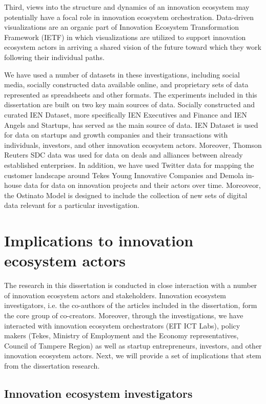 Third, views into the structure and dynamics of an innovation ecosystem may potentially have a focal role in innovation ecosystem orchestration. Data-driven visualizations are an organic part of Innovation Ecosystem Transformation Framework (IETF) in which visualizations are utilized to support innovation ecosystem actors in arriving a shared vision of the future toward which they work following their individual paths. 

We have used a number of datasets in these investigations, including social media, socially constructed data available online, and proprietary sets of data represented as spreadsheets and other formats. The experiments included in this dissertation are built on two key main sources of data. Socially constructed and curated IEN Dataset, more specifically IEN Executives and Finance and IEN Angels and Startups, has served as the main source of data. IEN Dataset is used for data on startups and growth companies and their transactions with individuals, investors, and other innovation ecosystem actors. Moreover, Thomson Reuters SDC data was used for data on deals and alliances between already established enterprises. In addition, we have used Twitter data for mapping the customer landscape around Tekes Young Innovative Companies and Demola in-house data for data on innovation projects and their actors over time. Moreoveor, the Ostinato Model is designed to include the collection of new sets of digital data relevant for a particular investigation.

\section{Implications to innovation ecosystem actors} 

The research in this dissertation is conducted in close interaction with a number of innovation ecosystem actors and stakeholders. Innovation ecosystem investigators, i.e. the co-authors of the articles included in the dissertation, form the core group of co-creators. Moreover, through the investigations, we have interacted with innovation ecosystem orchestrators (EIT ICT Labs), policy makers (Tekes, Ministry of Employment and the Economy representatives, Council of Tampere Region) as well as startup entrepreneurs, investors, and other innovation ecosystem actors. Next, we will provide a set of implications that stem from the dissertation research.

\subsection{Innovation ecosystem investigators}

